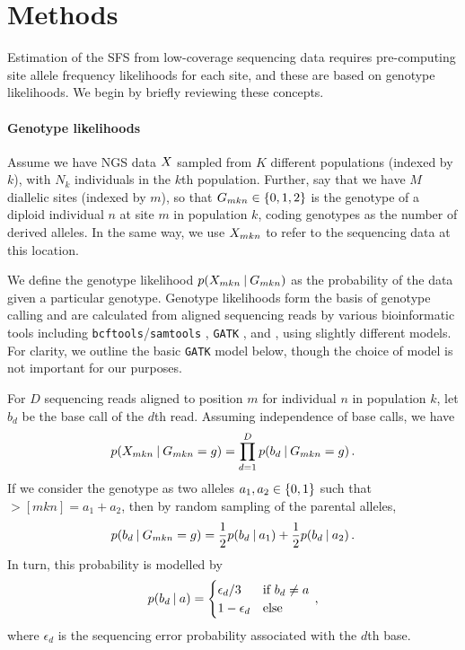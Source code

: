 \section{Methods}

Estimation of the SFS from low-coverage sequencing data requires pre-computing site allele frequency likelihoods for each site, and these are based on genotype likelihoods. 
We begin by briefly reviewing these concepts.

\paragraph{Genotype likelihoods}

Assume we have NGS data $\data$ sampled from $K$ different populations (indexed by $k$), with $N_k$ individuals in the $k$th population.
Further, say that we have $M$ diallelic sites (indexed by $m$), so that $\gt[mkn] \in \set{0, 1, 2}$ is the genotype of a diploid individual $n$ at site $m$ in population $k$, coding genotypes as the number of derived alleles.
In the same way, we use $\data[mkn]$ to refer to the sequencing data at this location.

We define the genotype likelihood $\prob(\data[mkn] \given \gt[mkn])$ as the probability of the data given a particular genotype.
Genotype likelihoods form the basis of genotype calling and are calculated from aligned sequencing reads by various bioinformatic tools including \texttt{bcftools}/\texttt{samtools} \cite{Li2009, Danecek2021}, \texttt{GATK} \cite{McKenna2010}, and \angsd \cite{Korneliussen2014}, using slightly different models.
For clarity, we outline the basic \texttt{GATK} model below, though the choice of model is not important for our purposes.

For $D$ sequencing reads aligned to position $m$ for individual $n$ in population $k$, let $b_d$ be the base call of the $d$th read. Assuming independence of base calls, we have
%
\begin{equation}\label{eq:gl1}
    \prob(\data[mkn] \given \gt[mkn] = g)
	= \prod_{d = 1}^D 
        \prob(b_d \given \gt[mkn] = g)
    \, .
\end{equation}
%
If we consider the genotype as two alleles $a_1, a_2 \in \{0, 1\}$ such that $\gt[mkn] = a_1 + a_2$, then by random sampling of the parental alleles,
%
\begin{equation}\label{eq:gl2}
    \prob(b_d \given \gt[mkn] = g)
	= \frac{1}{2} 
        \prob(b_d \given a_1) + 
        \frac{1}{2} \prob(b_d \given a_2) 
    \, .
\end{equation}
%
In turn, this probability is modelled by
%
\begin{equation}\label{eq:gl3}
    \prob(b_d \given a) =
    \begin{cases}
        \epsilon_d / 3 & \text{if $b_d \neq a$} \\
        1 - \epsilon_d  & \text{else}
    \end{cases}
    \, ,
\end{equation}
%
where $\epsilon_d$ is the sequencing error probability associated with the $d$th base.


